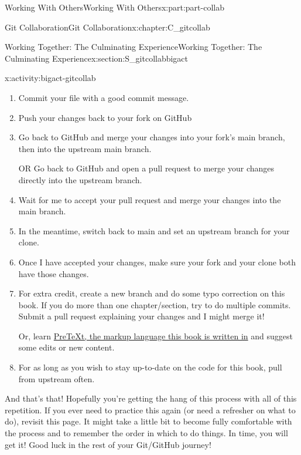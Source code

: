 \documentclass[oneside,10pt,]{book}
\begin{document}
\begin{partptx}{Working With Others}{}{Working With Others}{}{}{x:part:part-collab}
\begin{chapterptx}{Git Collaboration}{}{Git Collaboration}{}{}{x:chapter:C_gitcollab}
\begin{sectionptx}{Working Together: The Culminating Experience}{}{Working Together: The Culminating Experience}{}{}{x:section:S_gitcollabbigact}
\begin{activity}{}{x:activity:bigact-gitcollab}
\begin{enumerate}[font=\bfseries,label=(\alph*),ref=\alph*]
\item{}Commit your file with a good commit message.%
\item{}Push your changes back to your fork on GitHub%
\item{}Go back to GitHub and merge your changes into your fork's main branch, then into the upstream main branch.%
\par
OR Go back to GitHub and open a pull request to merge your changes directly into the upstream branch.%
\item{}Wait for me to accept your pull request and merge your changes into the main branch.%
\item{}In the meantime, switch back to main and set an upstream branch for your clone.%
\item{}Once I have accepted your changes, make sure your fork and your clone both have those changes.%
\item{}For extra credit, create a new branch and do some typo correction on this book. If you do more than one chapter\slash{}section, try to do multiple commits. Submit a pull request explaining your changes and I might merge it!%
\par
Or, learn \href{https://pretextbook.org}{PreTeXt, the markup language this book is written in}\footnotemark{} and suggest some edits or new content.%
\item{}For as long as you wish to stay up-to-date on the code for this book, pull from upstream often.%
\end{enumerate}
\end{activity}%
%
%
\begin{conclusion}{}%
And that's that! Hopefully you're getting the hang of this process with all of this repetition. If you ever need to practice this again (or need a refresher on what to do), revisit this page. It might take a little bit to become fully comfortable with the process and to remember the order in which to do things. In time, you will get it! Good luck in the rest of your Git\slash{}GitHub journey!%
\end{conclusion}%
\end{sectionptx}
\end{chapterptx}
\end{partptx}
%
\appendix%
%
\end{document}
